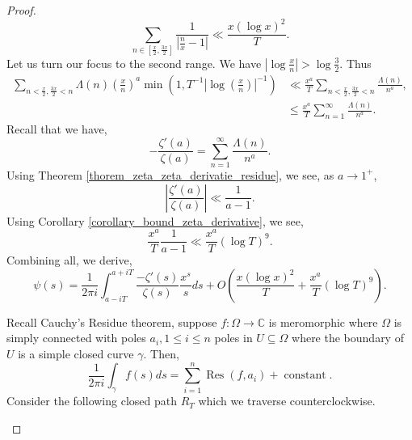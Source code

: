 \documentclass{article}
\DeclareMathOperator{\Res}{Res}
\DeclareMathOperator{\constant}{constant}
\newcommand{\C}[0]{\mathbb{C}}
\begin{document}
\begin{proof}
\begin{equation*}
      \sum_{n\in\left[{\frac x 2},{\frac {3x} 2}\right]}{\frac 1 {\left\vert {\frac n x}-1\right\vert}}\ll {\frac {x(\log x)^2} {T}}.
    \end{equation*}
    Let us turn our focus to the second range. We have $\left\vert \log{\frac x n}\right\vert>\log{\frac 3 2}$. Thus 
    \begin{align*}
      \sum_{n<{\frac x 2},{\frac {3x} 2}<n}\Lambda(n)\left({\frac x n}\right)^a\min\left(1,T^{-1}\left\vert\log\left({\frac x n}\right)\right\vert^{-1}\right)&\ll  {\frac {x^a} T}\sum_{n<{\frac x 2},{\frac {3x} 2}<n}{\frac {\Lambda(n)} {n^a}},\\
      &\leq {\frac {x^a} T}\sum_{n=1}^\infty{\frac {\Lambda(n)} {n^a}}.
    \end{align*}
    Recall that we have,
    \begin{equation*}
      -{\frac {\zeta'(a)} {\zeta(a)}} = \sum_{n=1}^\infty {\frac {\Lambda(n)} {n^a}}.
    \end{equation*}
    Using Theorem \ref{thorem_zeta_zeta_derivatie_residue}, we see, as $a\to1^+$,
    \begin{equation*}
      \left\vert{\frac {\zeta'(a)} {\zeta(a)}}\right\vert\ll {\frac 1 {a-1}}.
    \end{equation*}
    Using Corollary \ref{corollary_bound_zeta_derivative}, we see,
    \begin{equation*}
      {\frac {x^a} T}{\frac 1 {a-1}}\ll {\frac {x^a} {T}}(\log T)^9.
    \end{equation*}
    Combining all, we derive,
    \begin{equation*}
      \psi(s)={\frac 1 {2\pi i}}\int_{a-iT}^{a+iT}{\frac {-\zeta'(s)} {\zeta(s)}}{\frac {x^s} s}ds+O\left({\frac {x(\log x)^2} {T}}+{\frac {x^a} T}(\log T)^9\right).
    \end{equation*}
    \par Recall Cauchy's Residue theorem, suppose $f:\Omega\to\C$ is meromorphic where $\Omega$ is simply connected with poles $a_i,1\leq i\leq n$ poles in $U\subseteq\Omega$ where the boundary of $U$ is a simple closed curve $\gamma$. Then,
    \begin{equation*}
      {\frac 1 {2\pi i}}\int_\gamma f(s)ds = \sum_{i=1}^n \Res(f,a_i)+\constant.
    \end{equation*}
    Consider the following closed path $R_T$ which we traverse counterclockwise.
    \begin{center}
\end{center}
\end{proof}
\end{document}
